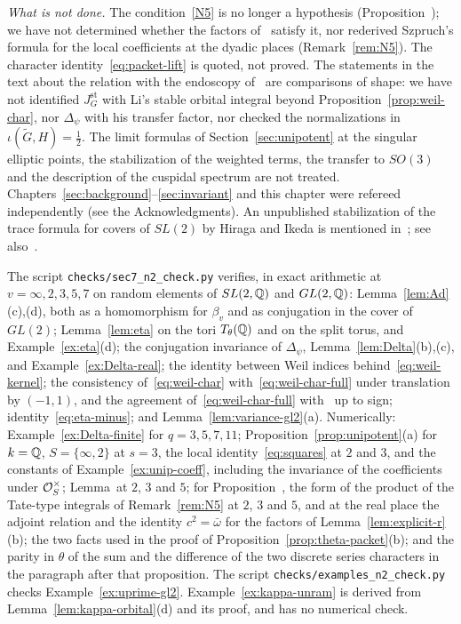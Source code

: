 \begin{remarkrev}
\emph{What is not done.} The condition~\ref{N5} is no longer a
hypothesis (Proposition~\normref{}); we have not determined whether the
factors of~\cite{Li12a} satisfy it, nor rederived Szpruch's formula for
the local coefficients at the dyadic places (Remark~\ref{rem:N5}). The
character identity~\eqref{eq:packet-lift} is quoted, not proved. The
statements in the text about the relation
with the endoscopy of~\cite{Li11,Li15,Li21} are comparisons of shape: we
have not identified $J^{\mathrm{st}}_G$ with Li's stable orbital integral
beyond Proposition~\ref{prop:weil-char}, nor $\Delta_\psi$ with his
transfer factor, nor checked the normalizations in
$\iota(\tilde G,H)=\frac12$. The limit formulas of
Section~\ref{sec:unipotent} at the singular elliptic points, the
stabilization of the weighted terms, the transfer to $SO(3)$ and the
description of the cuspidal spectrum are not treated. Chapters~\ref{sec:background}--\ref{sec:invariant}
and this chapter were refereed independently (see the Acknowledgments). An unpublished
stabilization of the trace formula for covers of $SL(2)$ by Hiraga and
Ikeda is mentioned in~\cite{Li15}; see also~\cite{HI13}.
\end{remarkrev}

\begin{remarkrev}\label{rem:verified-sec7}
The script \texttt{checks/sec7\_n2\_check.py} verifies, in exact
arithmetic at $v=\infty,2,3,5,7$ on random elements of $SL(2,\mathbb{Q})$ and
$GL(2,\mathbb{Q})$: Lemma~\ref{lem:Ad}(c),(d), both as a homomorphism for
$\beta_v$ and as conjugation in the cover of $GL(2)$;
Lemma~\ref{lem:eta} on the tori $T_\theta(\mathbb{Q})$ and on the split torus,
and Example~\ref{ex:eta}(d); the conjugation invariance of $\Delta_\psi$,
Lemma~\ref{lem:Delta}(b),(c), and Example~\ref{ex:Delta-real}; the
identity between Weil indices behind~\eqref{eq:weil-kernel}; the
consistency of~\eqref{eq:weil-char} with~\eqref{eq:weil-char-full} under
translation by $(-1,1)$, and the agreement of~\eqref{eq:weil-char-full}
with~\cite[Theorem~1C]{Th08} up to sign;
identity~\eqref{eq:eta-minus}; and Lemma~\ref{lem:variance-gl2}(a).
Numerically: Example~\ref{ex:Delta-finite} for $q=3,5,7,11$;
Proposition~\ref{prop:unipotent}(a) for $k=\mathbb{Q}$, $S=\{\infty,2\}$ at
$s=3$, the local identity~\eqref{eq:squares} at $2$ and $3$, and the
constants of Example~\ref{ex:unip-coeff}, including the invariance of the
coefficients under $\mathcal{O}_S^\times$; Lemma~\shellref at $2$, $3$ and $5$;
for Proposition~\normref{}, the form of the product of the Tate-type
integrals of Remark~\ref{rem:N5} at $2$, $3$ and $5$, and at the real
place the adjoint relation and the identity $c^2=\bar\omega$ for the
factors of Lemma~\ref{lem:explicit-r}(b); the two facts used in the proof of
Proposition~\ref{prop:theta-packet}(b); and the parity in $\theta$ of the
sum and the difference of the two discrete series characters in the
paragraph after that proposition. The script
\texttt{checks/examples\_n2\_check.py} checks
Example~\ref{ex:uprime-gl2}. Example~\ref{ex:kappa-unram} is derived
from Lemma~\ref{lem:kappa-orbital}(d) and its proof, and has no
numerical check.
\end{remarkrev}
